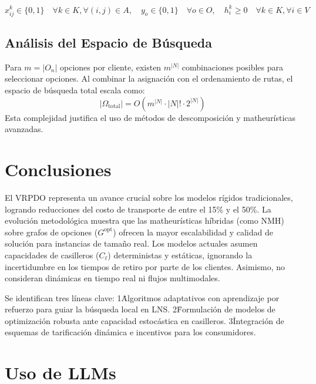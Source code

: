 \documentclass[letter, 10pt]{article}
\begin{document}
 \begin{equation} x_{ij}^k \in \{0, 1\} \quad \forall k \in K, \forall (i, j) \in A, \quad y_o \in \{0, 1\} \quad \forall o \in O, \quad h_i^k \ge 0 \quad \forall k \in K, \forall i \in V \label{eq:dominios} 
    \end{equation} 
\subsection{Análisis del Espacio de Búsqueda} 
Para $m = |O_n|$ opciones por cliente, existen $m^{|N|}$ combinaciones posibles para seleccionar opciones. Al combinar la asignación con el ordenamiento de rutas, el espacio de búsqueda total escala como: 
\begin{equation} 
    |\Omega_{\text{total}}| = O\left(m^{|N|} \cdot |N|! \cdot 2^{|N|}\right) 
\end{equation} 
Esta complejidad justifica el uso de métodos de descomposición y matheurísticas avanzadas. 

\section{Conclusiones} 
El VRPDO representa un avance crucial sobre los modelos rígidos tradicionales, logrando reducciones del costo de transporte de entre el 15\% y el 50\%. La evolución metodológica muestra que las matheurísticas híbridas (como NMH) sobre grafos de opciones ($G^{\text{opt}}$) ofrecen la mayor escalabilidad y calidad de solución para instancias de tamaño real. 
\vspace{2mm}
Los modelos actuales asumen capacidades de casilleros ($C_\ell$) deterministas y estáticas, ignorando la incertidumbre en los tiempos de retiro por parte de los clientes. Asimismo, no consideran dinámicas en tiempo real ni flujos multimodales. 

Se identifican tres líneas clave: 1\. Algoritmos adaptativos con aprendizaje por refuerzo para guiar la búsqueda local en LNS. 2\. Formulación de modelos de optimización robusta ante capacidad estocástica en casilleros. 3\. Integración de esquemas de tarificación dinámica e incentivos para los consumidores. 

\section{Uso de LLMs}
\end{document}
